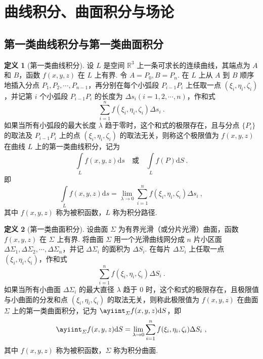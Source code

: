 \documentclass[zihao=-4,linespread=1.8,UTF8,nothm]{aytony_base}
\theoremstyle{definition}
\newtheorem{definition}{\indent\heiti\textbf{定义}}[subsection]
\begin{document}
\section{曲线积分、曲面积分与场论}

\subsection{第一类曲线积分与第一类曲面积分}

\begin{definition}[第一类曲线积分]
    设 $L$ 是空间 $\mathbb{R}^3$ 上一条可求长的连续曲线，其端点为 $A$ 和 $B$，函数 $f(x, y, z)$ 在 $L$ 上有界. 令 $A = P_0, B = P_n$. 在 $L$ 上从 $A$ 到 $B$ 顺序地插入分点 ${P}_1, {P}_2, \cdots, {P}_{n-1}$，再分别在每个小弧段 $P_{i-1}P_i$ 上任取一点 $(\xi_i, \eta_i, \zeta_i)$，并记第 $i$ 个小弧段 $P_{i-1}P_i$ 的长度为 $\Delta s_i(i = 1, 2, \cdots, n)$，作和式 $$
        \sum\limits_{i = 1}^{n}f(\xi_i, \eta_i, \zeta_i)\Delta s_i\ .
    $$ 如果当所有小弧段的最大长度 $\lambda$ 趋于零时，这个和式的极限存在，且与分点 $\{P_i\}$ 的取法及 $P_{i-1}P_i$ 上的点 $(\xi_i, \eta_i, \zeta_i)$ 的取法无关，则称这个极限值为 $f(x, y, z)$ 在曲线 $L$ 上的第一类曲线积分，记为 $$
        \int\limits_{L}^{}f(x, y, z)\mathrm{d}s \quad \text{或} \quad \int\limits_{L}^{}f(P)\mathrm{d}S\ .
    $$ 即 $$
        \int\limits_{L}^{}f(x, y, z)\mathrm{d}s = \lim\limits_{\lambda \to 0} \sum\limits_{i = 1}^{n}f(\xi_i, \eta_i, \zeta_i)\Delta s_i\ ,
    $$ 其中 $f(x, y, z)$ 称为被积函数，$L$ 称为积分路径.
\end{definition}

\begin{definition}[第一类曲面积分]
    设曲面 $\varSigma$ 为有界光滑（或分片光滑）曲面，函数 $f(x, y, z)$ 在 $\varSigma$ 上有界. 将曲面 $\varSigma$ 用一个光滑曲线网分成 $n$ 片小区面 ${\Delta\varSigma}_1, {\Delta\varSigma}_2, \cdots, {\Delta\varSigma}_{n}$，并记 $\Delta\varSigma_i$ 的面积为 $\Delta S_i$. 在每片 $\Delta\varSigma_i$ 上任取一点 $(\xi_i, \eta_i, \zeta_i)$，作和式 $$
        \sum\limits_{i = 1}^{n}f(\xi_i, \eta_i, \zeta_i)\Delta S_i\ .
    $$ 如果当所有小曲面 $\Delta\varSigma_i$ 的最大直径 $\lambda$ 趋于 $0$ 时，这个和式的极限存在，且极限值与小曲面的分发和点 $(\xi_i, \eta_i, \zeta_i)$ 的取法无关，则称此极限值为 $f(x, y, z)$ 在曲面 $\varSigma$ 上的第一类曲面积分，记为 $\displaystyle\ayiint_{\varSigma}^{}f(x, y, z)\mathrm{d}S$，即 $$
        \ayiint_{\varSigma}^{}f(x, y, z)\mathrm{d}S = \lim\limits_{\lambda \to 0} \sum\limits_{i = 1}^{n}f(\xi_i, \eta_i, \zeta_i)\Delta S_i\ ,
    $$ 其中 $f(x, y, z)$ 称为被积函数，$\varSigma$ 称为积分曲面.
\end{definition}
\end{document}
